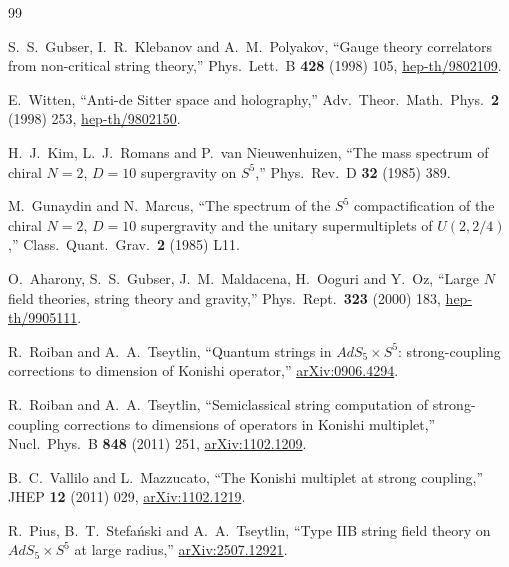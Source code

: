 \documentclass[12pt]{article}
\begin{document}
\begin{thebibliography}{99}

S.~S.~Gubser, I.~R.~Klebanov and A.~M.~Polyakov,
``Gauge theory correlators from non-critical string theory,''
Phys.\ Lett.\ B {\bf 428} (1998) 105,
\href{https://arxiv.org/abs/hep-th/9802109}{hep-th/9802109}.

E.~Witten,
``Anti-de Sitter space and holography,''
Adv.\ Theor.\ Math.\ Phys.\ {\bf 2} (1998) 253,
\href{https://arxiv.org/abs/hep-th/9802150}{hep-th/9802150}.

H.~J.~Kim, L.~J.~Romans and P.~van Nieuwenhuizen,
``The mass spectrum of chiral $N=2$, $D=10$ supergravity on $S^5$,''
Phys.\ Rev.\ D {\bf 32} (1985) 389.

M.~Gunaydin and N.~Marcus,
``The spectrum of the $S^5$ compactification of the chiral $N=2$, $D=10$ supergravity and the
unitary supermultiplets of $U(2,2/4)$,''
Class.\ Quant.\ Grav.\ {\bf 2} (1985) L11.

O.~Aharony, S.~S.~Gubser, J.~M.~Maldacena, H.~Ooguri and Y.~Oz,
``Large $N$ field theories, string theory and gravity,''
Phys.\ Rept.\ {\bf 323} (2000) 183,
\href{https://arxiv.org/abs/hep-th/9905111}{hep-th/9905111}.

R.~Roiban and A.~A.~Tseytlin,
``Quantum strings in $AdS_5\times S^5$: strong-coupling corrections to dimension of Konishi operator,''
\href{https://arxiv.org/abs/0906.4294}{arXiv:0906.4294}.

R.~Roiban and A.~A.~Tseytlin,
``Semiclassical string computation of strong-coupling corrections to dimensions of operators in Konishi multiplet,''
Nucl.\ Phys.\ B {\bf 848} (2011) 251,
\href{https://arxiv.org/abs/1102.1209}{arXiv:1102.1209}.

B.~C.~Vallilo and L.~Mazzucato,
``The Konishi multiplet at strong coupling,''
JHEP {\bf 12} (2011) 029,
\href{https://arxiv.org/abs/1102.1219}{arXiv:1102.1219}.

R.~Pius, B.~T.~Stefa\'nski and A.~A.~Tseytlin,
``Type IIB string field theory on $AdS_5\times S^5$ at large radius,''
\href{https://arxiv.org/abs/2507.12921}{arXiv:2507.12921}.

\end{thebibliography}
\end{document}
